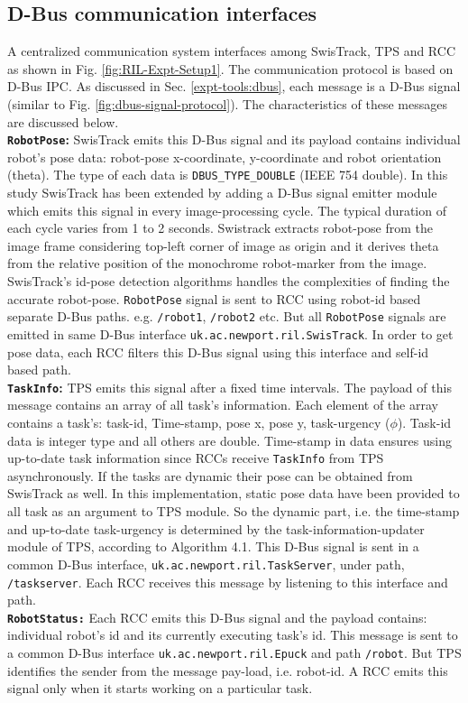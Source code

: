 \subsection{D-Bus communication interfaces}
A centralized communication system  interfaces among SwisTrack, TPS and RCC as shown in Fig. \ref{fig:RIL-Expt-Setup1}. The communication protocol is based on D-Bus IPC. As discussed in Sec. \ref{expt-tools:dbus}, each message is a D-Bus signal (similar to Fig. \ref{fig:dbus-signal-protocol}). The characteristics of these messages are discussed below.\\
\textbf{\texttt{RobotPose}:} SwisTrack emits this D-Bus signal and its payload contains individual robot's pose data: robot-pose x-coordinate,  y-coordinate and robot orientation (theta). The type of each data is \texttt{DBUS\_TYPE\_DOUBLE} (IEEE 754 double). In this study SwisTrack  has been extended by adding a D-Bus signal emitter module which emits this signal in every image-processing cycle. The typical duration of each cycle varies from 1 to 2 seconds.  Swistrack extracts robot-pose from the image frame considering top-left corner of image as origin and it derives  theta from the relative position of the monochrome robot-marker from the image. SwisTrack's id-pose detection algorithms handles the complexities of finding the accurate robot-pose. \texttt{RobotPose} signal is sent to RCC using robot-id based separate D-Bus paths. e.g. \texttt{/robot1}, \texttt{/robot2} etc.  But all \texttt{RobotPose} signals are emitted in same D-Bus interface \texttt{uk.ac.newport.ril.SwisTrack}. In order to get pose data, each RCC filters this D-Bus signal using this interface and self-id based path.\\
\textbf{\texttt{TaskInfo}:} TPS emits this signal after a fixed time intervals. The payload of this message contains an array of all task's information. Each element of the array contains a task's: task-id, Time-stamp, pose x, pose y, task-urgency ($\phi$). Task-id data is integer type and  all others are double. Time-stamp in data ensures using up-to-date task information since RCCs receive \texttt{TaskInfo} from TPS asynchronously. If the tasks are dynamic their pose can be obtained from SwisTrack as well. In  this implementation,  static pose data have been provided to all task as an argument to TPS module. So the dynamic part, i.e. the time-stamp and up-to-date task-urgency is determined by the task-information-updater module of TPS, according to Algorithm 4.1. This D-Bus signal is sent in a common D-Bus interface, \texttt{uk.ac.newport.ril.TaskServer}, under path, \texttt{/taskserver}.  Each RCC receives this message by listening to this interface and path.\\
\textbf{\texttt{RobotStatus:}} Each RCC emits this D-Bus signal and the payload contains: individual robot's id and its currently executing task's id. This message is sent to a common D-Bus interface \texttt{uk.ac.newport.ril.Epuck} and path \texttt{/robot}.  But TPS identifies the sender from the message pay-load, i.e. robot-id. A RCC emits this signal only when it starts working on a particular task. 
